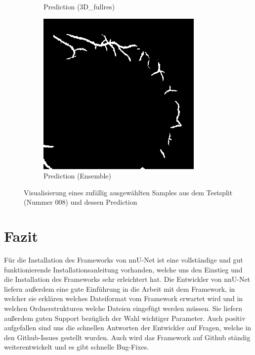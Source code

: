 \begin{figure}[H]
\begin{minipage}{.3\textwidth}
\begin{subfigure}{\textwidth}
\caption{Prediction (3D\_fullres)}
\end{subfigure}
\end{minipage}
\begin{minipage}{.3\textwidth}
\begin{subfigure}{\textwidth}
\includegraphics[width=\textwidth]{Pictures/nnUnet/Praxis/Task108-Retina3D/vis/ens_008-66.png}
\caption{Prediction (Ensemble)}
\end{subfigure}
\end{minipage}
\caption{Visualisierung eines zufällig ausgewählten Samples aus dem Testsplit (Nummer 008) und dessen Prediction}
\label{pic:Vis_108}
\end{figure}






\section{Fazit}

Für die Installation des Frameworks von nnU-Net ist eine vollständige und gut funktionierende Installationsanleitung vorhanden, welche uns den Einstieg und die Installation des Frameworks sehr erleichtert hat. Die Entwickler von nnU-Net liefern außerdem eine gute Einführung in die Arbeit mit dem Framework, in welcher sie erklären welches Dateiformat vom Framework erwartet wird und in welchen Ordnerstrukturen welche Dateien eingefügt werden müssen. Sie liefern außerdem guten Support bezüglich der Wahl wichtiger Parameter. Auch positiv aufgefallen sind uns die schnellen Antworten der Entwickler auf Fragen, welche in den Github-Issues gestellt wurden. Auch wird das Framework auf Github ständig weiterentwickelt und es gibt schnelle Bug-Fixes. 

